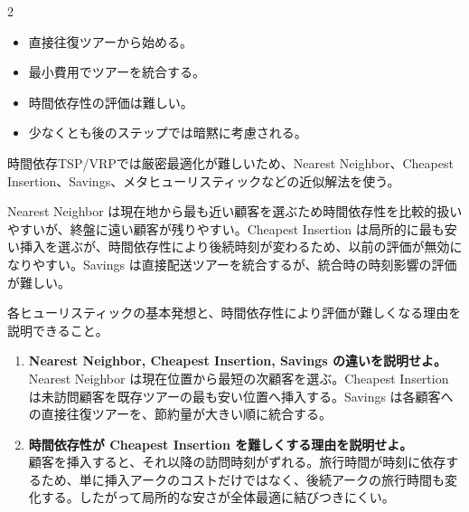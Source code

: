 \clearpage



\vspace{1.5mm}

\begin{multicols}{2}

\footnotesize

\raggedcolumns


\begin{itemize}
\item 直接往復ツアーから始める。
\item 最小費用でツアーを統合する。
\item 時間依存性の評価は難しい。
\item 少なくとも後のステップでは暗黙に考慮される。
\end{itemize}

時間依存TSP/VRPでは厳密最適化が難しいため、Nearest Neighbor、Cheapest Insertion、Savings、メタヒューリスティックなどの近似解法を使う。\par

Nearest Neighbor は現在地から最も近い顧客を選ぶため時間依存性を比較的扱いやすいが、終盤に遠い顧客が残りやすい。Cheapest Insertion は局所的に最も安い挿入を選ぶが、時間依存性により後続時刻が変わるため、以前の評価が無効になりやすい。Savings は直接配送ツアーを統合するが、統合時の時刻影響の評価が難しい。\par

各ヒューリスティックの基本発想と、時間依存性により評価が難しくなる理由を説明できること。\par


\begin{enumerate}
\item \textbf{Nearest Neighbor, Cheapest Insertion, Savings の違いを説明せよ。}\\
Nearest Neighbor は現在位置から最短の次顧客を選ぶ。Cheapest Insertion は未訪問顧客を既存ツアーの最も安い位置へ挿入する。Savings は各顧客への直接往復ツアーを、節約量が大きい順に統合する。
\item \textbf{時間依存性が Cheapest Insertion を難しくする理由を説明せよ。}\\
顧客を挿入すると、それ以降の訪問時刻がずれる。旅行時間が時刻に依存するため、単に挿入アークのコストだけではなく、後続アークの旅行時間も変化する。したがって局所的な安さが全体最適に結びつきにくい。
\end{enumerate}

\end{multicols}

